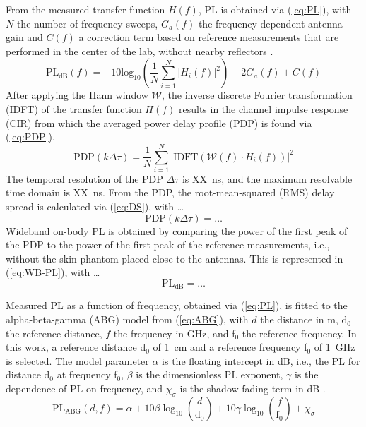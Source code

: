 \documentclass[preprint]{rsl}
\begin{document}
From the measured transfer function $H(f)$, PL is obtained via (\ref{eq:PL}), with $N$ the number of frequency sweeps, $G_a(f)$ the frequency-dependent antenna gain and $C(f)$ a correction term based on reference measurements that are performed in the center of the lab, without nearby reflectors \cite{DeBeelde2021}.
\begin{equation}
\label{eq:PL}
\text{PL}_{\text{dB}}(f)= -10 \text{log}_{10} \left( \frac{1}{N} \sum_{i=1}^N | H_i(f) |^2 \right) + 2 G_a(f) + C(f)
\end{equation}
After applying the Hann window $\mathcal{W}$, the inverse discrete Fourier transformation (IDFT) of the transfer function $H(f)$ results in the channel impulse response (CIR) from which the averaged power delay profile (PDP) is found via (\ref{eq:PDP}).
\begin{equation}
\text{PDP}(k\Delta\tau) = \frac{1}{N} \sum_{i=1}^N | \text{IDFT}(\mathcal{W}(f) \cdot H_i(f)) |^2
\label{eq:PDP}
\end{equation}
The temporal resolution of the PDP $\Delta\tau$ is XX~ns, and the maximum resolvable time domain is XX~ns.
From the PDP, the root-mean-squared (RMS) delay spread is calculated via (\ref{eq:DS}), with \dots
\begin{equation}
\text{PDP}(k\Delta\tau) = \dots
\label{eq:DS}
\end{equation}
Wideband on-body PL is obtained by comparing the power of the first peak of the PDP to the power of the first peak of the reference measurements, i.e., without the skin phantom placed close to the antennas. 
This is represented in (\ref{eq:WB-PL}), with \dots
\begin{equation}
\text{PL}_\text{dB} = \dots
\label{eq:WB-PL}
\end{equation}

Measured PL as a function of frequency, obtained via (\ref{eq:PL}), is fitted to the alpha-beta-gamma (ABG) model from (\ref{eq:ABG}), with $d$ the distance in m, d$_0$ the reference distance, $f$ the frequency in GHz, and f$_0$ the reference frequency.  
In this work, a reference distance d$_0$ of 1~cm and a reference frequency f$_0$ of 1~GHz is selected.
The model parameter $\alpha$ is the floating intercept in dB, i.e., the PL for distance d$_0$ at frequency f$_0$, $\beta$ is the dimensionless PL exponent, $\gamma$ is the dependence of PL on frequency, and $\chi_{\sigma}$ is the shadow fading term in dB \cite{Salous2020}. 
\begin{equation}
  \text{PL}_{\text{ABG}}(d,f) = \alpha + 10 \beta \log_{10}\left(\frac{d}{\text{d}_0}\right) + 10 \gamma \log_{10}\left(\frac{f}{ \text{f}_0}\right) + \chi_{\sigma}
  \label{eq:ABG}
\end{equation}
\end{document}

